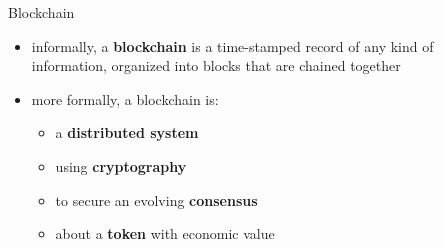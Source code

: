 \documentclass[
  ignorenonframetext,
]{beamer}
\providecommand{\tightlist}{%
  \setlength{\itemsep}{0pt}\setlength{\parskip}{0pt}}
\begin{document}
\begin{frame}{Blockchain}
\protect\hypertarget{blockchain}{}
\begin{itemize}[<+->]
\tightlist
\item
  informally, a \textbf{blockchain} is a time-stamped record of any kind
  of information, organized into blocks that are chained together
\item
  more formally, a blockchain is:

  \begin{itemize}[<+->]
  \tightlist
  \item
    a \textbf{distributed system}
  \item
    using \textbf{cryptography}
  \item
    to secure an evolving \textbf{consensus}
  \item
    about a \textbf{token} with economic value
  \end{itemize}
\end{itemize}
\end{frame}
\end{document}
